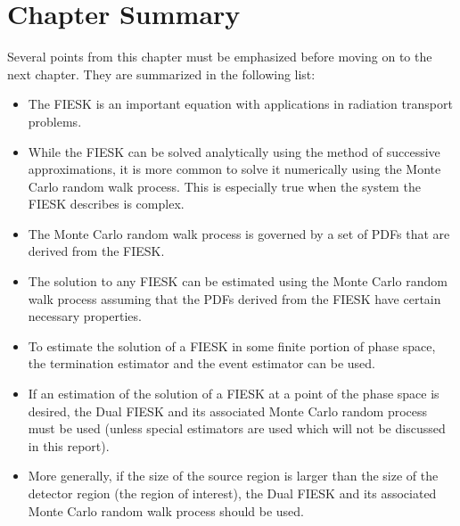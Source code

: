\section{Chapter Summary}
Several points from this chapter must be emphasized before moving on to the
next chapter. They are summarized in the following list:
\begin{itemize}
  \item The FIESK is an important equation with applications in radiation
    transport problems.
  \item While the FIESK can be solved analytically using the method of 
    successive approximations, it is more common to solve it numerically using
    the Monte Carlo random walk process. This is especially true when the
    system the FIESK describes is complex.
  \item The Monte Carlo random walk process is governed by a set of PDFs that
    are derived from the FIESK.
  \item The solution to any FIESK can be estimated using the Monte Carlo
    random walk process assuming that the PDFs derived from the FIESK have
    certain necessary properties. 
  \item To estimate the solution of a FIESK in some finite portion of phase
    space, the termination estimator and the event estimator can be used.
  \item If an estimation of the solution of a FIESK at a point of the phase 
    space is desired, the Dual FIESK and its associated Monte Carlo random 
    process must be used (unless special estimators are used which will not be 
    discussed in this report).
  \item More generally, if the size of the source region is larger than
    the size of the detector region (the region of interest), the Dual FIESK
    and its associated Monte Carlo random walk process should be used. 
\end{itemize}
